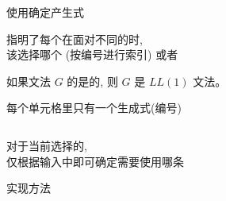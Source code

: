 \begin{frame}{}
  \begin{center}
    {\large 使用确定产生式}
    

    
    指明了每个在面对不同的时, \\[4pt]
    该选择哪个 (按编号进行索引) 或者
  \end{center}
\end{frame}

\begin{frame}{}
  \begin{center}
    \begin{definition}[$LL(1)$文法]
      如果文法 $G$ 的是的,
      则 $G$ 是 $LL(1)$ 文法。
    \end{definition}

     每个单元格里只有一个生成式(编号) \\[8pt]

    \begin{columns}
        
        
    \end{columns}

    \vspace{0.60cm}
    对于当前选择的, \\[4pt]
    仅根据输入中即可确定需要使用哪条
  \end{center}
\end{frame}

\begin{frame}{}
  \begin{center}
    {\large {}实现方法}

    \begin{columns}
        
        
        
    \end{columns}
  \end{center}
\end{frame}

